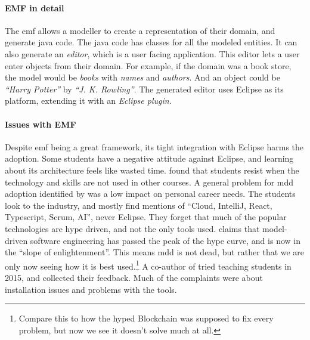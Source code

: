 \paragraph*{EMF in detail}
The \acrlong{emf} allows a modeller to create a representation of their domain, and generate java code. The java code has classes for all the modeled entities.
It can also generate an \textit{editor}, which is a user facing application.
This editor lets a user enter objects from their domain. For example, if the domain was a book store, the model would be \textit{books} with \textit{names} and \textit{authors}. And an object could be \textit{``Harry Potter''} by \textit{``J. K. Rowling''}. The generated editor uses \gls{Eclipse} as its platform, extending it with an \textit{Eclipse plugin}.

\paragraph*{Issues with EMF}
Despite \acrshort{emf} being a great framework, its tight integration with \gls{Eclipse} harms the adoption. Some students have a negative attitude against \gls{Eclipse}, and learning about its architecture feels like wasted time.
\textcite{kuzniarzTeachingModelDrivenSoftware2016} found that students resist when the technology and skills are not used in other courses.
A general problem for \acrshort{mdd} adoption identified by \textcite{jonwhittleTaxonomyToolrelatedIssues2015} was a low impact on personal career needs. 
The students look to the industry, and mostly find mentions of ``Cloud, IntelliJ, React, Typescript, Scrum, AI'', never Eclipse. They forget that much of the popular technologies are hype driven, and not the only tools used.
\textcite[p.~21--23]{brambillaModelDrivenSoftwareEngineering2017} claims that model-driven software engineering has passed the peak of the hype curve, and is now in the ``slope of enlightenment''. This means \acrshort{mdd} is not dead, but rather that we are only now seeing how it is best used.\footnote{Compare this to how the hyped Blockchain was supposed to fix every problem, but now we see it doesn't solve much at all.} A co-author of \cite{brambillaModelDrivenSoftwareEngineering2017} tried teaching students in 2015, and collected their feedback. Much of the complaints were about installation issues and problems with the tools. \cite{jordicabotFailedConvinceMy2015}

